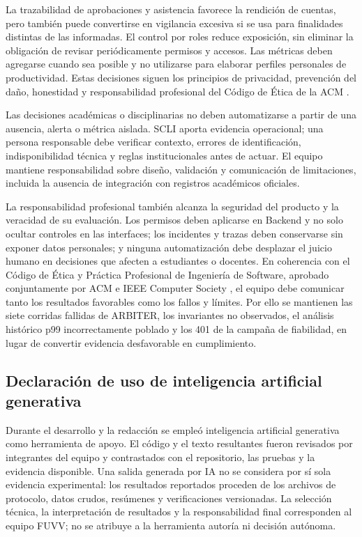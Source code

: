 La trazabilidad de aprobaciones y asistencia favorece la rendición de cuentas,
pero también puede convertirse en vigilancia excesiva si se usa para finalidades
distintas de las informadas. El control por roles reduce exposición, sin
eliminar la obligación de revisar periódicamente permisos y accesos. Las
métricas deben agregarse cuando sea posible y no utilizarse para elaborar
perfiles personales de productividad. Estas decisiones siguen los principios
de privacidad, prevención del daño, honestidad y responsabilidad profesional
del Código de Ética de la ACM \cite{acm2018code}.

Las decisiones académicas o disciplinarias no deben automatizarse a partir de
una ausencia, alerta o métrica aislada. SCLI aporta evidencia operacional; una
persona responsable debe verificar contexto, errores de identificación,
indisponibilidad técnica y reglas institucionales antes de actuar. El equipo
mantiene responsabilidad sobre diseño, validación y comunicación de
limitaciones, incluida la ausencia de integración con registros académicos
oficiales.

La responsabilidad profesional también alcanza la seguridad del producto y la
veracidad de su evaluación. Los permisos deben aplicarse en Backend y no solo
ocultar controles en las interfaces; los incidentes y trazas deben conservarse
sin exponer datos personales; y ninguna automatización debe desplazar el juicio
humano en decisiones que afecten a estudiantes o docentes. En coherencia con el
Código de Ética y Práctica Profesional de Ingeniería de Software, aprobado
conjuntamente por ACM e IEEE Computer Society \cite{acmieee1999secode}, el equipo
debe comunicar tanto los resultados favorables como los fallos y límites. Por
ello se mantienen las siete corridas fallidas de ARBITER, los invariantes no
observados, el análisis histórico p99 incorrectamente poblado y los 401 de la
campaña de fiabilidad, en
lugar de convertir evidencia desfavorable en cumplimiento.

\subsection{Declaración de uso de inteligencia artificial generativa}
\label{subsec:declaracion-ia}

Durante el desarrollo y la redacción se empleó inteligencia artificial
generativa como herramienta de apoyo. El código y el texto resultantes fueron
revisados por integrantes del equipo y contrastados con el repositorio, las
pruebas y la evidencia disponible. Una salida generada por IA no se considera
por sí sola evidencia experimental: los resultados reportados proceden de los
archivos de protocolo, datos crudos, resúmenes y verificaciones versionadas. La
selección técnica, la interpretación de resultados y la responsabilidad final
corresponden al equipo FUVV; no se atribuye a la herramienta autoría ni decisión
autónoma.

